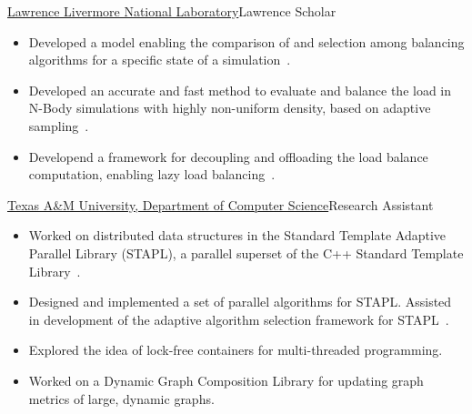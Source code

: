 		{\href{http://www.llnl.gov}{Lawrence Livermore National Laboratory}}{Lawrence Scholar}{}{}
		{\begin{itemize}
            \item Developed a model enabling the comparison of and selection among
                  balancing algorithms for a specific state of a simulation~\cite{pearce:ics12}.
            \item Developed an accurate and fast method to evaluate and balance the load in N-Body simulations
                  with highly non-uniform density, based on adaptive sampling~\cite{pearce:ics14}.
            \item Developend a framework for decoupling and offloading the load balance computation,
                  enabling lazy load balancing~\cite{pearce:ipdps16}.
		\end{itemize}}

		{\href{http://www.cse.tamu.edu/}{Texas A\&M University, Department of Computer Science}}{Research Assistant}{}{}
		{\begin{itemize}
			\item Worked on distributed data structures in the Standard Template Adaptive Parallel Library (STAPL),
			  a parallel superset of the C++ Standard Template Library~\cite{tanase:ppopp11,buss:systor10,tanase:lcpc09}.
			\item Designed and implemented a set of parallel algorithms for STAPL.
				Assisted in development of the adaptive algorithm selection framework for STAPL~\cite{thomas:ppopp05}.
			\item Explored the idea of lock-free containers for multi-threaded programming.
			\item Worked on a Dynamic Graph Composition Library for updating graph metrics of large, dynamic graphs.
		\end{itemize}}

